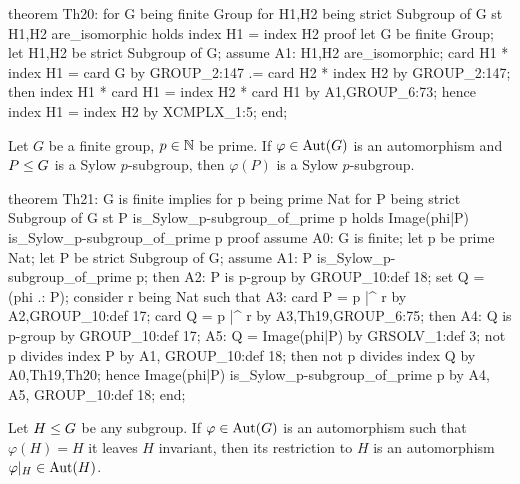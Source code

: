 \nwenddocs{}\endmoddef\nwstartdeflinemarkup{}\nwenddeflinemarkup
theorem Th20:
  for G being finite Group
  for H1,H2 being strict Subgroup of G
  st H1,H2 are_isomorphic
  holds index H1 = index H2
proof
  let G be finite Group;
  let H1,H2 be strict Subgroup of G;
  assume A1: H1,H2 are_isomorphic;
  card H1 * index H1 = card G by GROUP_2:147
                    .= card H2 * index H2 by GROUP_2:147;
  then index H1 * card H1 = index H2 * card H1 by A1,GROUP_6:73;
  hence index H1 = index H2 by XCMPLX_1:5;
end;
\eatline
{}\nwendcode{}\nwdocspar
\begin{theorem}
Let $G$ be a finite group, $p\in\mathbb{N}$ be prime. If $\varphi\in\operatorname{Aut}(G)$ is
an automorphism and $P\leq G$ is a Sylow $p$-subgroup, then
$\varphi(P)$ is a Sylow $p$-subgroup.
\end{theorem}

\nwenddocs{}\endmoddef\nwstartdeflinemarkup{}\nwenddeflinemarkup
theorem Th21:
  G is finite implies
  for p being prime Nat
  for P being strict Subgroup of G
  st P is_Sylow_p-subgroup_of_prime p
  holds Image(phi|P) is_Sylow_p-subgroup_of_prime p
proof
  assume A0: G is finite;
  let p be prime Nat;
  let P be strict Subgroup of G;
  assume A1: P is_Sylow_p-subgroup_of_prime p;
  then A2: P is p-group by GROUP_10:def 18;
  set Q = (phi .: P);
  consider r being Nat such that
  A3: card P = p |^ r
  by A2,GROUP_10:def 17;
  card Q = p |^ r by A3,Th19,GROUP_6:75;
  then A4: Q is p-group by GROUP_10:def 17;
  A5: Q = Image(phi|P) by GRSOLV_1:def 3;
  not p divides index P by A1, GROUP_10:def 18;
  then not p divides index Q by A0,Th19,Th20;
  hence Image(phi|P) is_Sylow_p-subgroup_of_prime p by A4, A5, GROUP_10:def 18;
end;
\eatline
{}\nwendcode{}\nwdocspar
\begin{theorem}\label{thm:characteristic:automorphism:automorphism-which-leaves-subgroup-invariant-is-automorphism-of-subgroup}
  Let $H\leq G$ be any subgroup.
  If $\varphi\in\operatorname{Aut}(G)$ is an automorphism such that $\varphi(H)=H$ it
  leaves $H$ invariant, then its restriction to $H$ is an automorphism
  $\varphi|_{H}\in\operatorname{Aut}(H)$.
\end{theorem}

